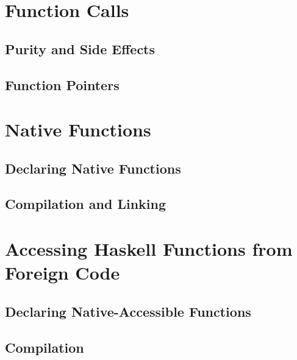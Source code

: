 \documentclass{beamer}
\begin{document}
\section{Function Calls}
\subsection{Purity and Side Effects}
\subsection{Function Pointers}

\section{Native Functions}
\subsection{Declaring Native Functions}
\subsection{Compilation and Linking}

\section{Accessing Haskell Functions from Foreign Code}
\subsection{Declaring Native-Accessible Functions}
\subsection{Compilation}
\begin{frame}
\end{frame}
\end{document}
